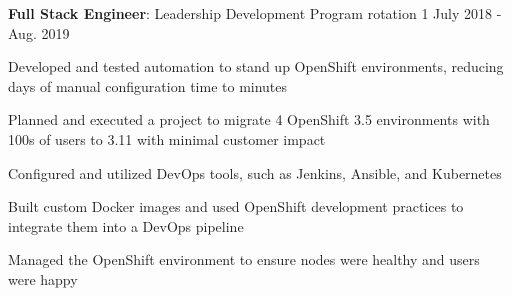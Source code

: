 \begin{cventries}

\vspace{-1.25em}
\cventry
{\textbf{Full Stack Engineer}: Leadership Development Program rotation 1} %
{} %
{} %
{July 2018 - Aug. 2019} %
{ %
\begin{cvitems}
\item {Developed and tested automation to stand up OpenShift environments, reducing days of manual configuration time to minutes}
\item {Planned and executed a project to migrate 4 OpenShift 3.5 environments with 100s of users to 3.11 with minimal customer impact}
\item {Configured and utilized DevOps tools, such as Jenkins, Ansible, and Kubernetes}
\item {Built custom Docker images and used OpenShift development practices to integrate them into a DevOps pipeline}
\item {Managed the OpenShift environment to ensure nodes were healthy and users were happy}
\end{cvitems}
}




\end{cventries}
